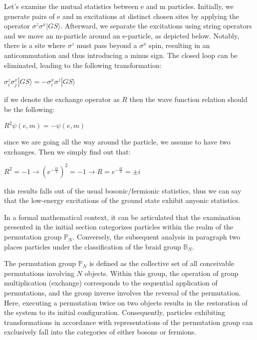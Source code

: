 Let's examine the mutual statistics between e and m particles. Initially, we generate pairs of e and m excitations at distinct chosen sites by applying the operator $\sigma^z\sigma^x|GS\rangle$. Afterward, we separate the excitations using string operators and we move an m-particle around an e-particle, as depicted below. Notably, there is a site where $\sigma^z$ must pass beyond a $\sigma^x$ spin, resulting in an anticommutation and thus introducing a minus sign. The closed loop can be eliminated, leading to the following transformation:

\begin{center}
	$\sigma_i^z\sigma_j^x|GS\rangle = - \sigma_i^x\sigma^z|GS\rangle$
\end{center}

if we denote the exchange operator as $R$ then the wave function relation should be the following:

\begin{center}
	$R^2\psi(e,m) = - \psi(e,m)$
\end{center}

since we are going all the way around the particle, we assume to have two exchanges. Then we simply find out that:

\begin{center}
	$R^2 = - 1 \rightarrow ( e^{-\frac{i\pi}{2}})^2 = - 1  \rightarrow R = e^{-\frac{i\pi}{2}} = \pm i $
\end{center}

this results falls out of the usual bosonic/fermionic statistics, thus we can say that the low-energy excitations of the ground state exhibit anyonic statistics.\newline



In a formal mathematical context, it can be articulated that the examination presented in the initial section categorizes particles within the realm of the permutation group $\mathbb{P}_N$. Conversely, the subsequent analysis in paragraph two places particles under the classification of the braid group $\mathbb{B}_N$. \newline

The permutation group $\mathbb{P}_N$ is defined as the collective set of all conceivable permutations involving $N$ objects. Within this group, the operation of group multiplication (exchange) corresponds to the sequential application of permutations, and the group inverse involves the reversal of the permutation.
Here, executing a permutation twice on two objects results in the restoration of the system to its initial configuration. Consequently, particles exhibiting transformations in accordance with representations of the permutation group can exclusively fall into the categories of either bosons or fermions. \newline


